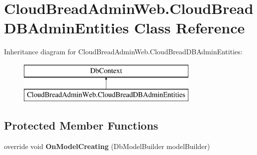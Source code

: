\hypertarget{a00065}{}\section{Cloud\+Bread\+Admin\+Web.\+Cloud\+Bread\+D\+B\+Admin\+Entities Class Reference}
\label{a00065}
Inheritance diagram for Cloud\+Bread\+Admin\+Web.\+Cloud\+Bread\+D\+B\+Admin\+Entities\+:\begin{figure}[H]
\begin{center}
\leavevmode
\includegraphics[height=2.000000cm]{a00065}
\end{center}
\end{figure}
\subsection*{Protected Member Functions}
\begin{DoxyCompactItemize}
\item 
override void {\bfseries On\+Model\+Creating} (Db\+Model\+Builder model\+Builder)\hypertarget{a00065_a5ccd5188cb9e1f2e6d2b679507002edb}{}\label{a00065_a5ccd5188cb9e1f2e6d2b679507002edb}

\end{DoxyCompactItemize}

